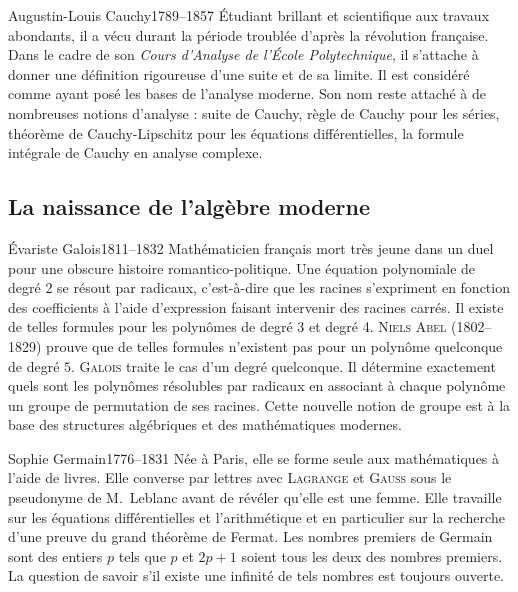 \documentclass[10pt,class=article,crop=false]{standalone}
\begin{document}
\begin{multicols}{2}
\begin{biographie}{Augustin-Louis Cauchy}{1789--1857}
\'Etudiant brillant et scientifique aux travaux abondants, il a vécu durant la période troublée d'après la révolution française.
Dans le cadre de son \emph{Cours d’Analyse de l’École Polytechnique}, il s’attache à donner une définition rigoureuse d’une suite et de sa limite. Il est considéré comme ayant posé les bases de l’analyse moderne.
Son nom reste attaché à de nombreuses notions d'analyse : suite de Cauchy, règle de Cauchy pour les séries, théorème de Cauchy-Lipschitz pour les équations différentielles,  la formule intégrale de Cauchy en analyse complexe.
\end{biographie}


\subsection{La naissance de l'algèbre moderne}

\begin{biographie}{Évariste Galois}{1811--1832}
Mathématicien français mort très jeune dans un duel pour une obscure histoire romantico-politique. Une équation polynomiale de degré $2$ se résout \og{}par radicaux\fg{}, c'est-à-dire que les racines s'expriment en fonction des coefficients à l'aide d'expression faisant intervenir des racines carrés.  Il existe de telles formules pour les polynômes de degré 3  et degré 4. \textsc{Niels Abel} (1802--1829) prouve que de telles formules n'existent pas pour un polynôme quelconque de degré $5$. \textsc{Galois} traite le cas d'un degré quelconque. Il détermine exactement quels sont les polynômes résolubles par radicaux en associant à chaque polynôme un groupe de permutation de ses racines. Cette nouvelle notion de groupe est à la base des structures algébriques et des mathématiques modernes.
\end{biographie}


\begin{biographie}{Sophie Germain}{1776--1831}
Née à Paris, elle se forme seule aux mathématiques à l'aide de livres.
Elle converse par lettres avec \textsc{Lagrange} et \textsc{Gauss} sous le pseudonyme de M.~Leblanc avant de révéler qu'elle est une femme.
Elle travaille sur les équations différentielles et l'arithmétique et en particulier sur la recherche d'une preuve du grand théorème de Fermat. 
Les nombres premiers de Germain sont des entiers $p$ tels que $p$ et $2p+1$ soient tous les deux des nombres premiers. La question de savoir s'il existe une infinité de tels nombres est toujours ouverte.
\end{biographie}



\end{multicols}
\end{document}
